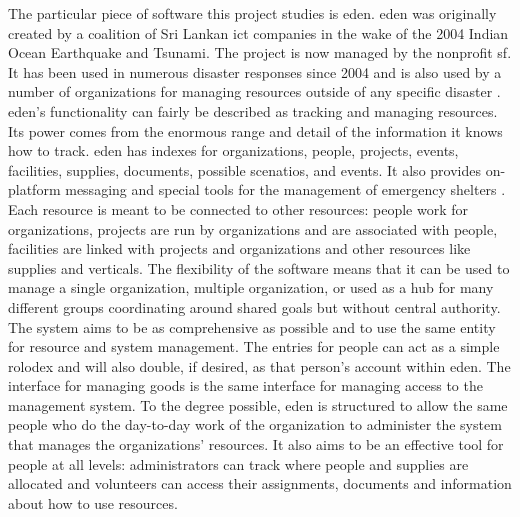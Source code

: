 \documentclass[a4paper,man,natbib]{apa6}
\begin{document}
   The particular piece of software this project studies is \acrlong{eden}. \acrshort{eden} was originally created by a coalition of Sri Lankan \acrlong{ict} companies in the wake of the 2004 Indian Ocean Earthquake and Tsunami. The project is now managed by the nonprofit \gls{sf}. It has been used in numerous disaster responses since 2004 and is also used by a number of organizations for managing resources outside of any specific disaster \citep{Sahana_Foundation_undated-hl}. \acrshort{eden}'s functionality can fairly be described as tracking and managing resources. Its power comes from the enormous range and detail of the information it knows how to track. \acrshort{eden} has indexes for organizations, people, projects, events, facilities, supplies, documents, possible scenatios, and events. It also provides on-platform messaging and special tools for the management of emergency shelters \citep{Sahana_Foundation2011-od}. Each resource is meant to be connected to other resources: people work for organizations, projects are run by organizations and are associated with people, facilities are linked with projects and organizations and other resources like supplies and verticals. The flexibility of the software means that it can be used to manage a single organization, multiple organization, or used as a hub for many different groups coordinating around shared goals but without central authority. The system aims to be as comprehensive as possible and to use the same entity for resource and system management. The entries for people can act as a simple rolodex and will also double, if desired, as that person's account within \acrshort{eden}. The interface for managing goods is the same interface for managing access to the management system. To the degree possible, \acrshort{eden} is structured to allow the same people who do the day-to-day work of the organization to administer the system that manages the organizations' resources. It also aims to be an effective tool for people at all levels: administrators can track where people and supplies are allocated and volunteers can access their assignments, documents and information about how to use resources.

   
   
\end{document}
